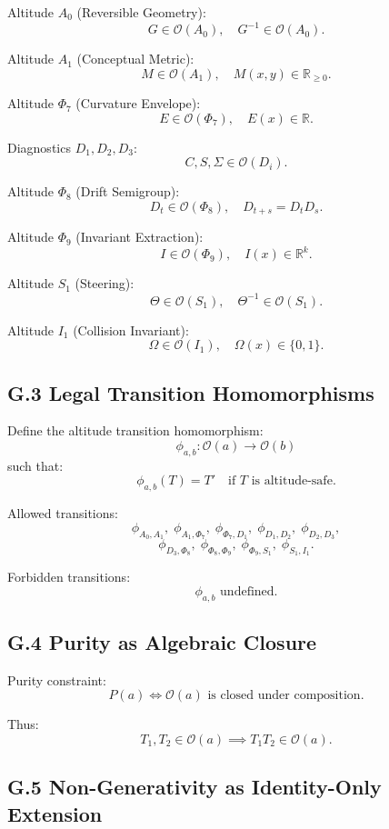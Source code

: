 Altitude $A_0$ (Reversible Geometry):
\[
G \in \mathcal{O}(A_0),\quad G^{-1} \in \mathcal{O}(A_0).
\]

Altitude $A_1$ (Conceptual Metric):
\[
M \in \mathcal{O}(A_1),\quad M(x,y) \in \mathbb{R}_{\ge 0}.
\]

Altitude $\Phi_7$ (Curvature Envelope):
\[
E \in \mathcal{O}(\Phi_7),\quad E(x) \in \mathbb{R}.
\]

Diagnostics $D_1, D_2, D_3$:
\[
C,S,\Sigma \in \mathcal{O}(D_i).
\]

Altitude $\Phi_8$ (Drift Semigroup):
\[
D_t \in \mathcal{O}(\Phi_8),\quad D_{t+s}=D_t D_s.
\]

Altitude $\Phi_9$ (Invariant Extraction):
\[
I \in \mathcal{O}(\Phi_9),\quad I(x) \in \mathbb{R}^k.
\]

Altitude $S_1$ (Steering):
\[
\Theta \in \mathcal{O}(S_1),\quad \Theta^{-1} \in \mathcal{O}(S_1).
\]

Altitude $I_1$ (Collision Invariant):
\[
\Omega \in \mathcal{O}(I_1),\quad \Omega(x) \in \{0,1\}.
\]

\subsection*{G.3 Legal Transition Homomorphisms}

Define the altitude transition homomorphism:
\[
\phi_{a,b} : \mathcal{O}(a) \to \mathcal{O}(b)
\]
such that:
\[
\phi_{a,b}(T) = T' \quad \text{if } T \text{ is altitude-safe}.
\]

Allowed transitions:
\[
\phi_{A_0,A_1},\;
\phi_{A_1,\Phi_7},\;
\phi_{\Phi_7,D_1},\;
\phi_{D_1,D_2},\;
\phi_{D_2,D_3},
\]
\[
\phi_{D_3,\Phi_8},\;
\phi_{\Phi_8,\Phi_9},\;
\phi_{\Phi_9,S_1},\;
\phi_{S_1,I_1}.
\]

Forbidden transitions:
\[
\phi_{a,b} \text{ undefined}.
\]

\subsection*{G.4 Purity as Algebraic Closure}

Purity constraint:
\[
P(a) \iff \mathcal{O}(a) \text{ is closed under composition}.
\]

Thus:
\[
T_1,T_2 \in \mathcal{O}(a) \implies T_1 T_2 \in \mathcal{O}(a).
\]

\subsection*{G.5 Non-Generativity as Identity-Only Extension}

